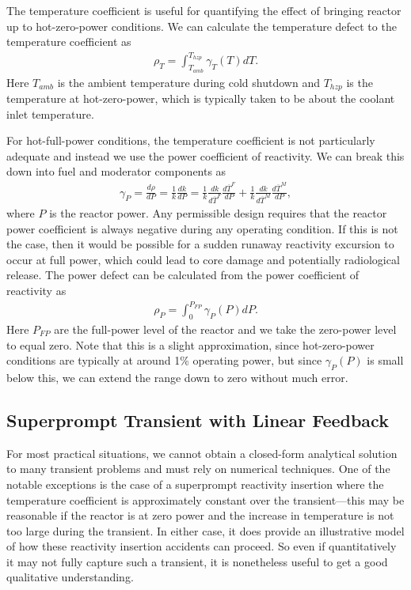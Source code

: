 The temperature coefficient is useful for quantifying the effect of bringing reactor up to hot-zero-power conditions. We can calculate the temperature defect to the temperature coefficient as
\begin{align}
  \rho_T = \int_{T_{amb}}^{T_{hzp}} \gamma_T(T) dT.
\end{align}
Here $T_{amb}$ is the ambient temperature during cold shutdown and $T_{hzp}$ is the temperature at hot-zero-power, which is typically taken to be about the coolant inlet temperature.

For hot-full-power conditions, the temperature coefficient is not particularly adequate and instead we use the power coefficient of reactivity. We can break this down into fuel and moderator components as
\begin{align}
  \gamma_P = \frac{d\rho}{dP} = \frac{1}{k} \frac{dk}{dP} = \frac{1}{k} \frac{dk}{d\overline{T}^F} \frac{d\overline{T}^F}{dP} + \frac{1}{k} \frac{dk}{d\overline{T}^M} \frac{d\overline{T}^M}{dP} ,
\end{align}
where $P$ is the reactor power. Any permissible design requires that the reactor power coefficient is always negative during any operating condition. If this is not the case, then it would be possible for a sudden runaway reactivity excursion to occur at full power, which could lead to core damage and potentially radiological release. The power defect can be calculated from the power coefficient of reactivity as
\begin{align}
  \rho_P = \int_{0}^{P_{FP}} \gamma_P(P) dP .
\end{align}
Here $P_{FP}$ are the full-power level of the reactor and we take the zero-power level to equal zero. Note that this is a slight approximation, since hot-zero-power conditions are typically at around 1\% operating power, but since $\gamma_P(P)$ is small below this, we can extend the range down to zero without much error.

\subsection{Superprompt Transient with Linear Feedback}

For most practical situations, we cannot obtain a closed-form analytical solution to many transient problems and must rely on numerical techniques. One of the notable exceptions is the case of a superprompt reactivity insertion where the temperature coefficient is approximately constant over the transient---this may be reasonable if the reactor is at zero power and the increase in temperature is not too large during the transient. In either case, it does provide an illustrative model of how these reactivity insertion accidents can proceed. So even if quantitatively it may not fully capture such a transient, it is nonetheless useful to get a good qualitative understanding.

